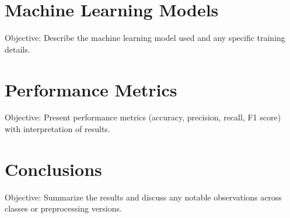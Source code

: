 \documentclass[12pt]{article}
\begin{document}
\section{Machine Learning Models}
Objective: Describe the machine learning model used and any specific training details.





\section{Performance Metrics}
Objective: Present performance metrics (accuracy, precision, recall, F1 score) with interpretation of results.






\section{Conclusions}
Objective: Summarize the results and discuss any notable observations across classes or preprocessing versions.



\end{document}
